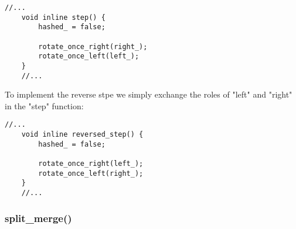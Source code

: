 \documentclass[11pt]{article}
\begin{document}
\begin{lstlisting}[style=CStyle]
	//...
	void inline step() {
  		hashed_ = false;

  		rotate_once_right(right_);
  		rotate_once_left(left_);
  	}
  	//...
\end{lstlisting}

To implement the reverse stpe we simply exchange the roles of "left" and "right" in the "step" function:

\begin{lstlisting}[style=CStyle]
	//...
  	void inline reversed_step() {
  		hashed_ = false;

  		rotate_once_right(left_);
  		rotate_once_left(right_);
  	}
  	//...
\end{lstlisting}

\subsubsection{split\_merge()}
\end{document}
